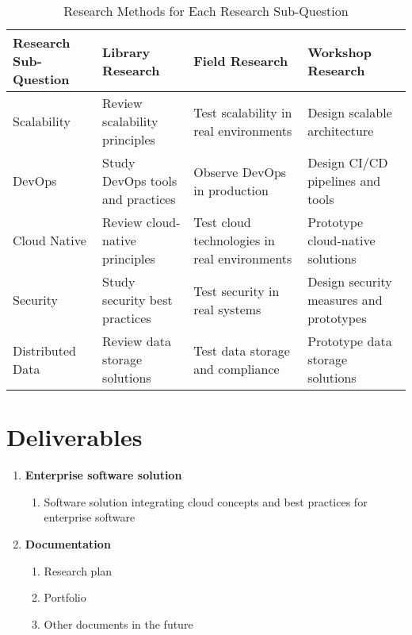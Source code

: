 \documentclass[12pt]{report}
\begin{document}
\begin{table}[h!]
	\centering
	\begin{tabular}{|p{5cm}|p{3cm}|p{3cm}|p{3cm}|}
		\hline
		\textbf{Research Sub-Question} & \textbf{Library Research} & \textbf{Field Research} & \textbf{Workshop Research} \\ \hline
		Scalability       & Review scalability principles & Test scalability in real environments & Design scalable architecture \\ \hline
		DevOps             & Study DevOps tools and practices & Observe DevOps in production & Design CI/CD pipelines and tools \\ \hline
		Cloud Native      & Review cloud-native principles & Test cloud technologies in real environments & Prototype cloud-native solutions \\ \hline
		Security          & Study security best practices & Test security in real systems & Design security measures and prototypes \\ \hline
    	Distributed Data  & Review data storage solutions & Test data storage and compliance & Prototype data storage solutions \\ \hline
	\end{tabular}
	\caption{Research Methods for Each Research Sub-Question}
\end{table}





\chapter{Deliverables}

\begin{enumerate}

	\item\textbf{\large{Enterprise software solution}}
    
  \begin{enumerate}

    \item[] Software solution integrating cloud concepts and best practices for enterprise software 
    
  \end{enumerate}

	\item\textbf{\large{Documentation}}

    \begin{enumerate}

		\item Research plan

		\item Portfolio

		\item Other documents in the future

	\end{enumerate}


\end{enumerate}
\end{document}
